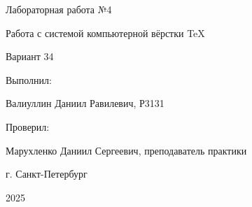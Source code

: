 \begin{center}
\begin{tikzpicture}[scale=0.5]
\end{tikzpicture}
    
\vspace{1cm}
    
Лабораторная работа №4
    
\vspace{0.5cm}

Работа с системой компьютерной вёрстки \TeX
    
\vspace{0.5cm}
    
Вариант 34
    
\vspace{5cm}
    
\begin{flushright}
Выполнил:

\vspace{0.2cm}

Валиуллин Даниил Равилевич, Р3131      

\vspace{0.2cm}

Проверил:

\vspace{0.2cm}

Марухленко Даниил Сергеевич, преподаватель практики

\end{flushright}

\vfill
    
г. Санкт-Петербург
 
2025

\end{center}
